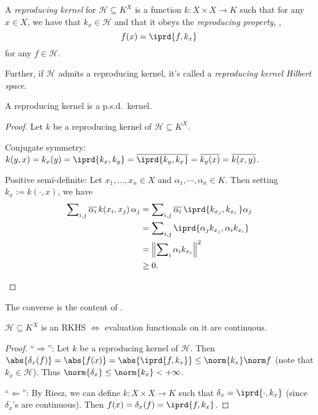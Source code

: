 	\begin{dfn}
		A \emph{reproducing kernel} for $\mathscr H\subseteq K^X$ is a function $k\colon X\times X\to K$ such that for any $x\in X$, we have that $k_x\in\mathscr H$ and that it obeys the \emph{reproducing property}, \ie,
		\[
		f(x) = \iprd{f, k_x}
		\]
		for any $f\in\mathscr H$.
		
		Further, if $\mathscr H$ admits a reproducing kernel, it's called a \emph{reproducing kernel Hilbert space}.
	\end{dfn}
	
	
	\begin{lem}\label{LEM: repr kernel is a psd kernel}
		A reproducing kernel is a p.s.d.\ kernel.
	\end{lem}
	
	\begin{proof}
		Let $k$ be a reproducing kernel of $\mathscr H\subseteq K^X$.
		\begin{prooflist}
			\item Conjugate symmetry: $k(y, x) = k_x(y) = \iprd{k_x, k_y} = \overline{\iprd{k_y, k_x}} = \overline{k_y(x)} = \overline{k(x, y)}$.
			
			\item Positive semi-definite: Let $x_1, \ldots, x_n\in X$ and $\alpha_1, \cdots, \alpha_n\in K$. Then setting $k_x := k(\cdot, x)$, we have
			\begin{align*}
				\sum\nolimits_{i, j} \overline{\alpha_i}\, k(x_i, x_j)\, \alpha_j 
				& = \sum\nolimits_{i, j} \overline{\alpha_i}\, \iprd{ k_{x_j}, k_{x_i}\, } \alpha_j\\
				& = \sum\nolimits_{i, j} \iprd{\alpha_j k_{x_j}, \alpha_i k_{x_i}}\\
				& = \left\Vert \sum\nolimits_i \alpha_i k_{x_i} \right\Vert^2\\
				& \ge 0\text.\qedhere
			\end{align*}
		\end{prooflist}
	\end{proof}
	
	\begin{rmk}
		The converse is the content of .
	\end{rmk}
	
	
	\begin{lem}
		$\mathscr H\subseteq K^X$ is an RKHS $\iff$ evaluation functionals on it are continuous.
	\end{lem}
	
	\begin{proof}
		``$\Rightarrow$'': Let $k$ be a reproducing kernel of $\mathscr H$. Then $\abs{\delta_x(f)} = \abs{f(x)} = \abs{\iprd{f, k_x}}\le \norm{k_x}\norm f$ (note that $k_x\in \mathscr H$). Thus $\norm{\delta_x}\le \norm{k_x} < +\infty$.
		
		``$\Leftarrow$'': By Riesz, we can define $k\colon X\times X\to K$ such that $\delta_x = \iprd{\cdot, k_x}$ (since $\delta_x$'s are continuous). Then $f(x) = \delta_x(f) = \iprd{f, k_x}$.
	\end{proof}
	
